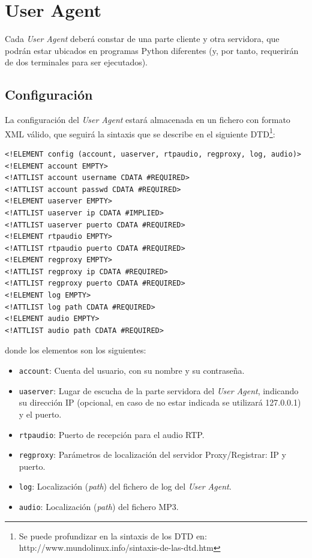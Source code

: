 \documentclass[a4paper,11pt]{article}
\begin{document}
\section{User Agent}

Cada \emph{User Agent} deberá constar de una parte cliente y otra servidora, que podrán estar ubicados en programas Python diferentes (y, por tanto, requerirán de dos terminales para ser ejecutados).

\subsection{Configuración}

La configuración del \emph{User Agent} estará almacenada en un fichero
con formato XML válido, que seguirá 
la sintaxis que se describe en el siguiente DTD\footnote{Se puede profundizar en la sintaxis de los DTD en: http://www.mundolinux.info/sintaxis-de-las-dtd.htm}:

\begin{verbatim}
<!ELEMENT config (account, uaserver, rtpaudio, regproxy, log, audio)>
<!ELEMENT account EMPTY>
<!ATTLIST account username CDATA #REQUIRED>
<!ATTLIST account passwd CDATA #REQUIRED>
<!ELEMENT uaserver EMPTY>
<!ATTLIST uaserver ip CDATA #IMPLIED>
<!ATTLIST uaserver puerto CDATA #REQUIRED>
<!ELEMENT rtpaudio EMPTY>
<!ATTLIST rtpaudio puerto CDATA #REQUIRED>
<!ELEMENT regproxy EMPTY>
<!ATTLIST regproxy ip CDATA #REQUIRED>
<!ATTLIST regproxy puerto CDATA #REQUIRED>
<!ELEMENT log EMPTY>
<!ATTLIST log path CDATA #REQUIRED>
<!ELEMENT audio EMPTY>
<!ATTLIST audio path CDATA #REQUIRED>
\end{verbatim}

donde los elementos son los siguientes:

\begin{itemize}
  \item \texttt{account}: Cuenta del usuario, con su nombre y su contraseña.
  \item \texttt{uaserver}: Lugar de escucha de la parte servidora del \emph{User Agent}, indicando su dirección IP (opcional, en caso de no estar indicada se utilizará 127.0.0.1) y el puerto.
  \item \texttt{rtpaudio}: Puerto de recepción para el audio RTP.
  \item \texttt{regproxy}: Parámetros de localización del servidor Proxy/Registrar: IP y puerto.
  \item \texttt{log}: Localización (\emph{path}) del fichero de log del \emph{User Agent}.
  \item \texttt{audio}: Localización (\emph{path}) del fichero MP3.
\end{itemize}
\end{document}
